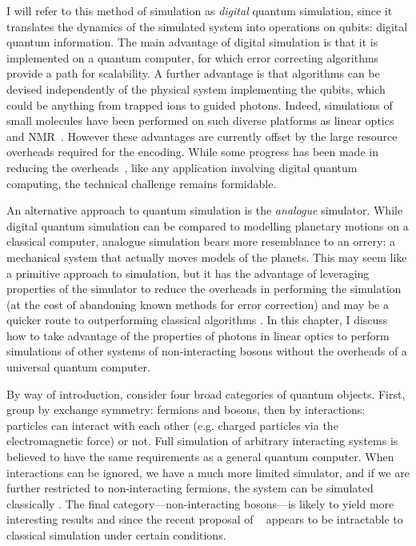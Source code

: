 I will refer to this method of simulation as \emph{digital} quantum simulation,
since it translates the dynamics of the simulated system into operations on
qubits: digital quantum information. The main advantage of digital simulation is
that it is implemented on a quantum computer, for which error correcting
algorithms provide a path for scalability. A further advantage is that
algorithms can be devised independently of the physical system implementing the
qubits, which could be anything from trapped ions to guided photons. Indeed,
simulations of small molecules have been performed on such diverse platforms as
linear optics~\cite{qsim-peruzzo} and NMR~\cite{qsim-du}. 
However these advantages are currently offset by the large resource overheads
required for the encoding. While some progress has been made in reducing the
overheads~\cite{qsim-poulin}, like any application involving digital quantum
computing, the technical challenge remains formidable.

An alternative approach to quantum simulation is the \emph{analogue} simulator.
While digital quantum simulation can be compared to modelling planetary motions
on a classical computer, analogue simulation bears more resemblance to an
orrery: a mechanical system that actually moves models of the planets. This may
seem like a primitive approach to simulation, but it has the advantage of
leveraging properties of the simulator to reduce the overheads in performing the
simulation (at the cost of abandoning known methods for error correction) and
may be a quicker route to outperforming classical algorithms
\cite{qsim-analogue}. In
this chapter, I discuss how to take advantage of the properties of photons in
linear optics to perform simulations of other systems of non-interacting bosons
without the overheads of a universal quantum computer.

By way of introduction, consider four broad categories of quantum objects.
First, group by exchange symmetry: fermions and bosons, then by interactions:
particles can interact with each other (e.g. charged particles via the
electromagnetic force) or not. Full simulation of arbitrary interacting systems
is believed to have the same requirements as a general quantum computer. When
interactions can be ignored, we have a much more limited simulator, and if we
are further restricted to non-interacting fermions, the system can be simulated
classically . The final category---non-interacting
bosons---is likely to yield more interesting results and since the recent
proposal of \bosonsampling{}~\cite{bosonsampling} appears to be intractable to
classical simulation under certain conditions.

